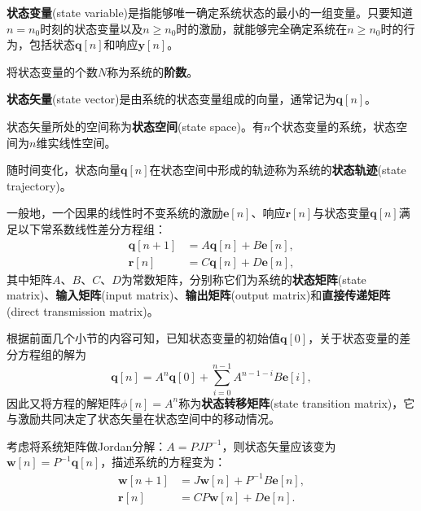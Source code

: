 \begin{definition}[状态变量]
    \textbf{状态变量}(state variable)是指能够唯一确定系统状态的最小的一组变量。只要知道$n=n_0$时刻的状态变量以及$n\geq n_0$时的激励，就能够完全确定系统在$n\geq n_0$时的行为，包括状态$\mathbf{q}[n]$和响应$\mathbf{y}[n]$。

    将状态变量的个数$N$称为系统的\textbf{阶数}。
\end{definition}

\begin{definition}[状态矢量]
    \textbf{状态矢量}(state vector)是由系统的状态变量组成的向量，通常记为$\mathbf{q}[n]$。
\end{definition}

\begin{definition}[状态空间和状态轨迹]
    状态矢量所处的空间称为\textbf{状态空间}(state space)。有$n$个状态变量的系统，状态空间为$n$维实线性空间。

    随时间变化，状态向量$\mathbf{q}[n]$在状态空间中形成的轨迹称为系统的\textbf{状态轨迹}(state trajectory)。
\end{definition}

一般地，一个因果的线性时不变系统的激励$\mathbf{e}[n]$、响应$\mathbf{r}[n]$与状态变量$\mathbf{q}[n]$满足以下常系数线性差分方程组：
\begin{equation}
    \begin{aligned}
        \mathbf{q}[n+1]&=A\mathbf{q}[n]+B\mathbf{e}[n], \\
        \mathbf{r}[n]&=C\mathbf{q}[n]+D\mathbf{e}[n],
    \end{aligned}
\end{equation}
其中矩阵$A$、$B$、$C$、$D$为常数矩阵，分别称它们为系统的\textbf{状态矩阵}(state matrix)、\textbf{输入矩阵}(input matrix)、\textbf{输出矩阵}(output matrix)和\textbf{直接传递矩阵}(direct transmission matrix)。

根据前面几个小节的内容可知，已知状态变量的初始值$\mathbf{q}[0]$，关于状态变量的差分方程组的解为
\begin{equation}
    \mathbf{q}[n]=A^n\mathbf{q}[0]+\sum_{i=0}^{n-1}A^{n-1-i}B\mathbf{e}[i],
\end{equation}
因此又将方程的解矩阵$\phi[n]=A^n$称为\textbf{状态转移矩阵}(state transition matrix)，它与激励共同决定了状态矢量在状态空间中的移动情况。

考虑将系统矩阵做Jordan分解：$A=PJP^{-1}$，则状态矢量应该变为$\mathbf{w}[n]=P^{-1}\mathbf{q}[n]$，描述系统的方程变为：
\begin{equation}
    \begin{aligned}
        \mathbf{w}[n+1]&=J\mathbf{w}[n]+P^{-1}B\mathbf{e}[n], \\
        \mathbf{r}[n]&=CP\mathbf{w}[n]+D\mathbf{e}[n].
    \end{aligned}
\end{equation}

